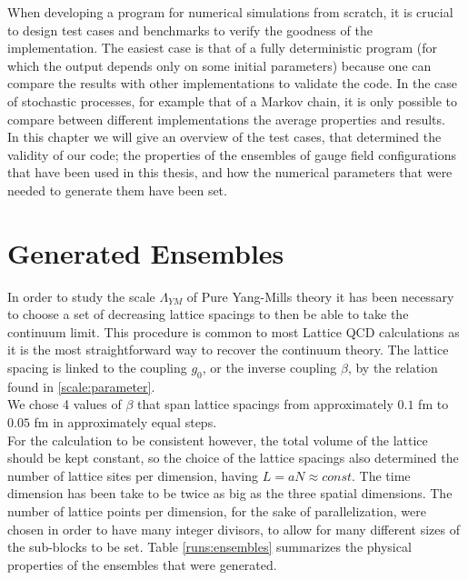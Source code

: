 When developing a program for numerical simulations from scratch, it is crucial to design test cases and benchmarks to verify the goodness of the implementation. The easiest case is that of a fully deterministic program (for which the output depends only on some initial parameters) because one can compare the results with other implementations to validate the code. In the case of stochastic processes, for example that of a Markov chain, it is only possible to compare between different implementations the average properties and results. \\
In this chapter we will give an overview of the test cases, that determined the validity of our code; the properties of the ensembles of gauge field configurations that have been used in this thesis, and how the numerical parameters that were needed to generate them have been set.

\section{Generated Ensembles}
In order to study the scale $\Lambda_{YM}$ of Pure Yang-Mills theory it has been necessary to choose a set of decreasing lattice spacings to then be able to take the continuum limit. This procedure is common to most Lattice QCD calculations as it is the most straightforward way to recover the continuum theory. The lattice spacing is linked to the coupling $g_0$, or the inverse coupling $\beta$, by the relation found in \cref{scale:parameter}.\\ 
We chose 4 values of $\beta$ that span lattice spacings from approximately $0.1$ fm to $0.05$ fm in approximately equal steps. \\
For the calculation to be consistent however, the total volume of the lattice should be kept constant, so the choice of the lattice spacings also determined the number of lattice sites per dimension, having $L = aN\approx const$. The time dimension has been take to be twice as big as the three spatial dimensions. The number of lattice points per dimension, for the sake of parallelization, were chosen in order to have many integer divisors, to allow for many different sizes of the sub-blocks to be set. Table \cref{runs:ensembles} summarizes the physical properties of the ensembles that were generated.

